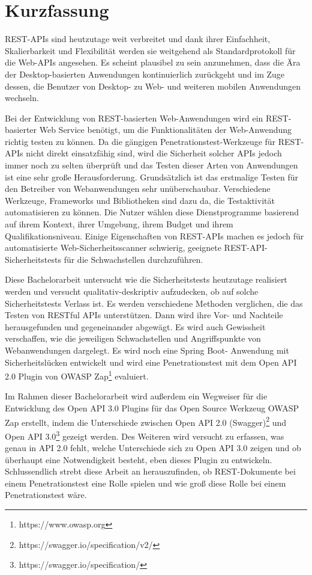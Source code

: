 \chapter{\textbf{Kurzfassung}}

REST-APIs sind heutzutage weit verbreitet und dank ihrer Einfachheit, Skalierbarkeit und Flexibilität werden sie weitgehend als Standardprotokoll für die Web-APIs angesehen. Es scheint plausibel zu sein anzunehmen, dass die Ära der Desktop-basierten Anwendungen kontinuierlich zurückgeht und im Zuge dessen, die Benutzer von Desktop- zu Web- und weiteren mobilen Anwendungen wechseln.

Bei der Entwicklung von REST-basierten Web-Anwendungen wird ein REST-basierter Web Service benötigt, um die Funktionalitäten der Web-Anwendung richtig testen zu können. Da die gängigen Penetrationstest-Werkzeuge für REST-APIs nicht direkt einsatzfähig sind, wird die Sicherheit solcher APIs jedoch immer noch zu selten überprüft und das Testen dieser Arten von Anwendungen ist eine sehr große Herausforderung. Grundsätzlich ist das erstmalige Testen für den Betreiber von Webanwendungen sehr unüberschaubar. Verschiedene Werkzeuge, Frameworks und Bibliotheken sind dazu da, die Testaktivität automatisieren zu können. Die Nutzer wählen diese Dienstprogramme basierend auf ihrem Kontext, ihrer Umgebung, ihrem Budget und ihrem Qualifikationsniveau. Einige Eigenschaften von REST-APIs machen es jedoch für automatisierte Web-Sicherheitsscanner schwierig, geeignete REST-API-Sicherheitstests für die Schwachstellen durchzuführen.

Diese Bachelorarbeit untersucht wie die Sicherheitstests heutzutage realisiert werden und versucht qualitativ-deskriptiv aufzudecken, ob auf solche Sicherheitstests Verlass ist. Es werden verschiedene Methoden verglichen, die das Testen von RESTful APIs unterstützen. Dann wird ihre Vor- und Nachteile herausgefunden und gegeneinander abgewägt. Es wird auch Gewissheit verschaffen, wie die jeweiligen Schwachstellen und Angriffspunkte von Webanwendungen dargelegt. Es wird noch eine Spring Boot- Anwendung mit Sicherheitslücken entwickelt und wird eine Penetrationstest mit dem Open API 2.0 Plugin von OWASP Zap\footnote{https://www.owasp.org} evaluiert.

Im Rahmen dieser Bachelorarbeit wird außerdem ein Wegweiser für die Entwicklung des Open API 3.0 Plugins für das Open Source Werkzeug OWASP Zap erstellt, indem die Unterschiede zwischen Open API 2.0 (Swagger)\footnote{https://swagger.io/specification/v2/} und Open API 3.0\footnote{https://swagger.io/specification/} gezeigt werden. Des Weiteren wird versucht zu erfassen, was genau in API 2.0 fehlt, welche Unterschiede sich zu Open API 3.0 zeigen und ob überhaupt eine Notwendigkeit besteht, eben dieses Plugin zu entwickeln. Schlussendlich strebt diese Arbeit an herauszufinden, ob REST-Dokumente bei einem Penetrationstest eine Rolle spielen und wie groß diese Rolle bei einem Penetrationstest wäre.